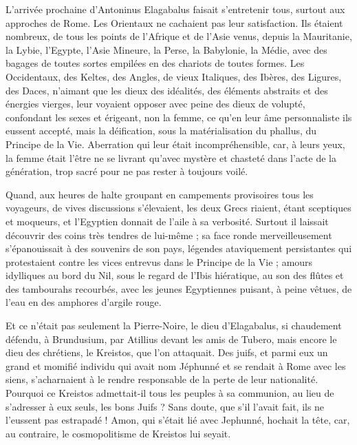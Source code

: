 \documentclass[a4paper, 11pt, oneside, polutonikogreek, french]{article}
\begin{document}
L'arrivée prochaine d'Antoninus Elagabalus faisait s'entretenir tous, surtout aux approches de Rome. Les Orientaux ne cachaient pas leur satisfaction. Ils étaient nombreux, de tous les points de l'Afrique et de l'Asie venus, depuis la Mauritanie, la Lybie, l'Egypte, l'Asie Mineure, la Perse, la Babylonie, la Médie, avec des bagages de toutes sortes empilées en des chariots de toutes formes. Les Occidentaux, des Keltes, des Angles, de vieux Italiques, des Ibères, des Ligures, des Daces, n'aimant que les dieux des idéalités, des éléments abstraits et des énergies vierges, leur voyaient opposer avec peine des dieux de volupté, confondant les sexes et érigeant, non la femme, ce qu'en leur âme personnaliste ils eussent accepté, mais la déification, sous la matérialisation du phallus, du Principe de la Vie. Aberration qui leur était incompréhensible, car, à leurs yeux, la femme était l'être ne se livrant qu'avec mystère et chasteté dans l'acte de la génération, trop sacré pour ne pas rester à toujours voilé.

Quand, aux heures de halte groupant en campements provisoires tous les voyageurs, de vives discussions s'élevaient, les deux Grecs riaient, étant sceptiques et moqueurs, et l'Egyptien donnait de l'aile à sa verbosité. Surtout il laissait découvrir des coins très tendres de lui-même ; sa face ronde merveilleusement s'épanouissait à des souvenirs de son pays, légendes ataviquement persistantes qui protestaient contre les vices entrevus dans le Principe de la Vie ; amours idylliques au bord du Nil, sous le regard de l'Ibis hiératique, au son des flûtes et des tambourahs recourbés, avec les jeunes Egyptiennes puisant, à peine vêtues, de l'eau en des amphores d'argile rouge.

Et ce n'était pas seulement la Pierre-Noire, le dieu d'Elagabalus, si chaudement défendu, à Brundusium, par Atillius devant les amis de Tubero, mais encore le dieu des chrétiens, le Kreistos, que l'on attaquait. Des juifs, et parmi eux un grand et momifié individu qui avait nom Jéphunné et se rendait à Rome avec les siens, s'acharnaient à le rendre responsable de la perte de leur nationalité. Pourquoi ce Kreistos admettait-il tous les peuples à sa communion, au lieu de s'adresser à eux seuls, les bons Juifs ? Sans doute, que s'il l'avait fait, ils ne l'eussent pas estrapadé ! Amon, qui s'était lié avec Jephunné, hochait la tête, car, au contraire, le cosmopolitisme de Kreistos lui seyait.
\end{document}
